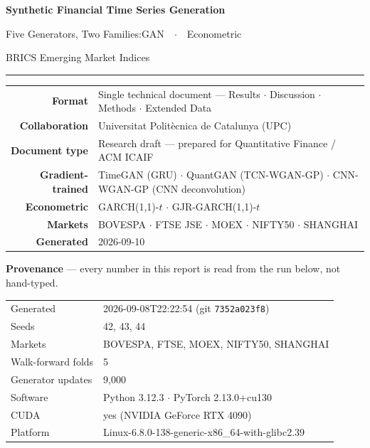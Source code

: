 \documentclass[10pt]{article}
\begin{document}
\thispagestyle{empty}
\pagecolor{Navy}\color{white}

\vspace*{2.0cm}
\begin{center}
{\fontsize{26}{32}\selectfont\bfseries Synthetic Financial Time Series Generation\par}
\vspace{0.4cm}
{\Large Five Generators, Two Families:\quad GAN\ \ $\cdot$\ \ Econometric\par}
\vspace{0.2cm}
{\large BRICS Emerging Market Indices\par}
\vspace{0.7cm}
\textcolor{blue!40!white}{\rule{0.65\textwidth}{0.5pt}}
\vspace{0.7cm}

\begin{tabular}{r@{\hspace{10pt}}l}
  \textbf{Format}        & Single technical document --- Results $\cdot$ Discussion $\cdot$ Methods $\cdot$ Extended Data \\[4pt]
  \textbf{Collaboration} & Universitat Polit\`{e}cnica de Catalunya (UPC) \\[4pt]
  \textbf{Document type} & Research draft --- prepared for Quantitative Finance / ACM ICAIF \\[4pt]
  \textbf{Gradient-trained} & TimeGAN (GRU) $\cdot$ QuantGAN (TCN-WGAN-GP) $\cdot$ CNN-WGAN-GP (CNN deconvolution) \\[4pt]
  \textbf{Econometric}   & GARCH(1,1)-$t$ $\cdot$ GJR-GARCH(1,1)-$t$ \\[4pt]
  \textbf{Markets}       & BOVESPA $\cdot$ FTSE JSE $\cdot$ MOEX $\cdot$ NIFTY50 $\cdot$ SHANGHAI \\[4pt]
  \textbf{Generated}     & 2026-09-10 \\
\end{tabular}
\end{center}
\clearpage\pagecolor{white}\color{black}

\begin{tcolorbox}[enhanced,arc=3pt,boxrule=0.8pt,
  colframe=Navy,colback=LBg,left=8pt,right=8pt,top=5pt,bottom=5pt]
\small\textbf{Provenance} --- every number in this report is read from the run below, not hand-typed.
\begin{tabular}{@{}ll@{}}
Generated & 2026-09-08T22:22:54 (git \texttt{7352a023f8}) \\
Seeds & 42, 43, 44 \\
Markets & BOVESPA, FTSE, MOEX, NIFTY50, SHANGHAI \\
Walk-forward folds & 5 \\
Generator updates & 9,000 \\
Software & Python 3.12.3 $\cdot$ PyTorch 2.13.0+cu130 \\
CUDA & yes (NVIDIA GeForce RTX 4090) \\
Platform & Linux-6.8.0-138-generic-x86\_64-with-glibc2.39\\
\end{tabular}
\end{tcolorbox}
\end{document}
